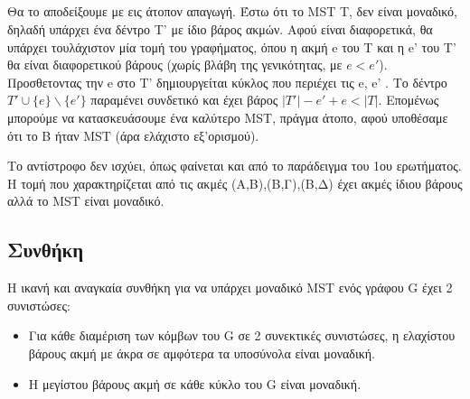 \documentclass[a4paper,11pt]{article}
\begin{document}
\begin{figure}[ht]
    \centering
\hspace{1cm}
\end{figure}

\subsection{}
Θα το αποδείξουμε με εις άτοπον απαγωγή. Έστω ότι το MST T, δεν είναι
μοναδικό, δηλαδή υπάρχει ένα δέντρο T' με ίδιο βάρος ακμών. Αφού είναι
διαφορετικά, θα υπάρχει τουλάχιστον μία τομή του γραφήματος, όπου η ακμή
e του T και η e' του Τ' θα είναι διαφορετικού βάρους (χωρίς βλάβη της
γενικότητας, με $e < e'$). Προσθετοντας την e στο Τ' δημιουργείται κύκλος που
περιέχει τις e, e' . Το δέντρο $T' \cup \{e\} \backslash \{e'\}$ παραμένει
συνδετικό και έχει βάρος $|T'| - e' + e < |T|$. Επομένως μπορούμε να
κατασκευάσουμε ένα καλύτερο MST, πράγμα άτοπο, αφού υποθέσαμε ότι το Β ήταν
MST (άρα ελάχιστο εξ'ορισμού).

Το αντίστροφο δεν ισχύει, όπως φαίνεται και από το παράδειγμα του 1ου
ερωτήματος. Η τομή που χαρακτηρίζεται από τις ακμές (Α,Β),(Β,Γ),(Β,Δ) έχει
ακμές ίδιου βάρους αλλά το MST είναι μοναδικό.
\subsection{Συνθήκη}
Η ικανή και αναγκαία συνθήκη για να υπάρχει μοναδικό MST ενός γράφου G έχει 2
συνιστώσες:
\begin{itemize}
    \item Για κάθε διαμέριση των κόμβων του G σε 2 συνεκτικές συνιστώσες, η
    ελαχίστου βάρους ακμή με άκρα σε αμφότερα τα υποσύνολα είναι μοναδική.
    \item Η μεγίστου βάρους ακμή σε κάθε κύκλο του G είναι μοναδική.
\end{itemize}
\end{document}
